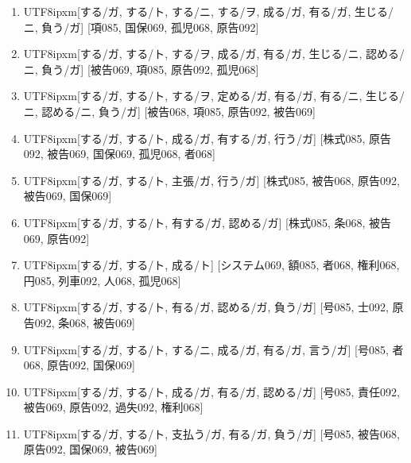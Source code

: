 \begin{enumerate}
\item \begin{CJK}{UTF8}{ipxm}[する/ガ, する/ト, する/ニ, する/ヲ, 成る/ガ, 有る/ガ, 生じる/ニ, 負う/ガ] [項085, 国保069, 孤児068, 原告092]\end{CJK}
\item \begin{CJK}{UTF8}{ipxm}[する/ガ, する/ト, する/ヲ, 成る/ガ, 有る/ガ, 生じる/ニ, 認める/ニ, 負う/ガ] [被告069, 項085, 原告092, 孤児068]\end{CJK}
\item \begin{CJK}{UTF8}{ipxm}[する/ガ, する/ト, する/ヲ, 定める/ガ, 有る/ガ, 有る/ニ, 生じる/ニ, 認める/ニ, 負う/ガ] [被告068, 項085, 原告092, 被告069]\end{CJK}
\item \begin{CJK}{UTF8}{ipxm}[する/ガ, する/ト, 成る/ガ, 有する/ガ, 行う/ガ] [株式085, 原告092, 被告069, 国保069, 孤児068, 者068]\end{CJK}
\item \begin{CJK}{UTF8}{ipxm}[する/ガ, する/ト, 主張/ガ, 行う/ガ] [株式085, 被告068, 原告092, 被告069, 国保069]\end{CJK}
\item \begin{CJK}{UTF8}{ipxm}[する/ガ, する/ト, 有する/ガ, 認める/ガ] [株式085, 条068, 被告069, 原告092]\end{CJK}
\item \begin{CJK}{UTF8}{ipxm}[する/ガ, する/ト, 成る/ト] [システム069, 額085, 者068, 権利068, 円085, 列車092, 人068, 孤児068]\end{CJK}
\item \begin{CJK}{UTF8}{ipxm}[する/ガ, する/ト, 有る/ガ, 認める/ガ, 負う/ガ] [号085, 士092, 原告092, 条068, 被告069]\end{CJK}
\item \begin{CJK}{UTF8}{ipxm}[する/ガ, する/ト, する/ニ, 成る/ガ, 有る/ガ, 言う/ガ] [号085, 者068, 原告092, 国保069]\end{CJK}
\item \begin{CJK}{UTF8}{ipxm}[する/ガ, する/ト, 成る/ガ, 有る/ガ, 認める/ガ] [号085, 責任092, 被告069, 原告092, 過失092, 権利068]\end{CJK}
\item \begin{CJK}{UTF8}{ipxm}[する/ガ, する/ト, 支払う/ガ, 有る/ガ, 負う/ガ] [号085, 被告068, 原告092, 国保069, 被告069]\end{CJK}

\end{enumerate}
